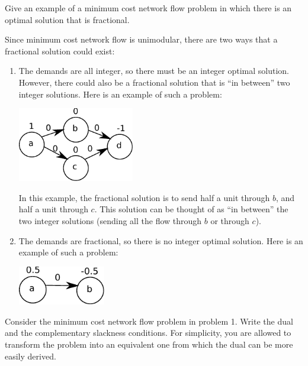 \documentclass[fleqn]{homework}
\begin{document}
  \begin{problem}{2}
    \begin{question}
      Give an example of a minimum cost network flow problem in which there is
      an optimal solution that is fractional.
    \end{question}

    Since minimum cost network flow is unimodular, there are two ways that a
    fractional solution could exist:

    \begin{enumerate}
    \item The demands are all integer, so there must be an integer optimal
      solution.  However, there could also be a fractional solution that is ``in
      between'' two integer solutions.  Here is an example of such a problem:

      \includegraphics[width=0.4\textwidth]{problem2-eg1.pdf}

      In this example, the fractional solution is to send half a unit through
      $b$, and half a unit through $c$.  This solution can be thought of as ``in
      between'' the two integer solutions (sending all the flow through $b$ or
      through $c$).

    \item The demands are fractional, so there is no integer optimal solution.
      Here is an example of such a problem:

      \includegraphics[width=0.3\textwidth]{problem2-eg2.pdf}
    \end{enumerate}
  \end{problem}

  \begin{problem}{3}
    \begin{question}
      Consider the minimum cost network flow problem in problem 1.  Write the
      dual and the complementary slackness conditions.  For simplicity, you are
      allowed to transform the problem into an equivalent one from which the
      dual can be more easily derived.
    \end{question}
  \end{problem}
\end{document}
